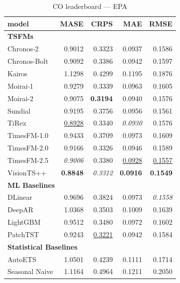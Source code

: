 \begin{table}[H]
\caption{CO leaderboard --- EPA}
\centering
\begin{small}
\begin{tabular}{lrrrr}
\toprule
model & MASE & CRPS & MAE & RMSE \\
\midrule
\multicolumn{5}{l}{\textbf{TSFMs}} \\
Chronos-2 & 0.9012 & 0.3323 & 0.0937 & 0.1586 \\
Chronos-Bolt & 0.9092 & 0.3386 & 0.0942 & 0.1597 \\
Kairos & 1.1298 & 0.4299 & 0.1195 & 0.1876 \\
Moirai-1 & 0.9279 & 0.3339 & 0.0963 & 0.1605 \\
Moirai-2 & 0.9075 & \textbf{0.3194} & 0.0940 & 0.1576 \\
Sundial & 0.9195 & 0.3756 & 0.0956 & 0.1561 \\
TiRex & \underline{0.8928} & 0.3340 & \textit{0.0930} & 0.1576 \\
TimesFM-1.0 & 0.9433 & 0.3709 & 0.0973 & 0.1609 \\
TimesFM-2.0 & 0.9166 & 0.3326 & 0.0946 & 0.1589 \\
TimesFM-2.5 & \textit{0.9006} & 0.3380 & \underline{0.0928} & \underline{0.1557} \\
VisionTS++ & \textbf{0.8848} & \textit{0.3312} & \textbf{0.0916} & \textbf{0.1549} \\
\midrule
\multicolumn{5}{l}{\textbf{ML Baselines}} \\
DLinear & 0.9696 & 0.3824 & 0.0973 & \textit{0.1558} \\
DeepAR & 1.0368 & 0.3503 & 0.1009 & 0.1639 \\
LightGBM & 0.9512 & 0.3480 & 0.0972 & 0.1602 \\
PatchTST & 0.9243 & \underline{0.3221} & 0.0942 & 0.1584 \\
\midrule
\multicolumn{5}{l}{\textbf{Statistical Baselines}} \\
AutoETS & 1.0501 & 0.4239 & 0.1111 & 0.1714 \\
Seasonal Naive & 1.1164 & 0.4964 & 0.1211 & 0.2050 \\
\bottomrule
\end{tabular}
\end{small}
\end{table}